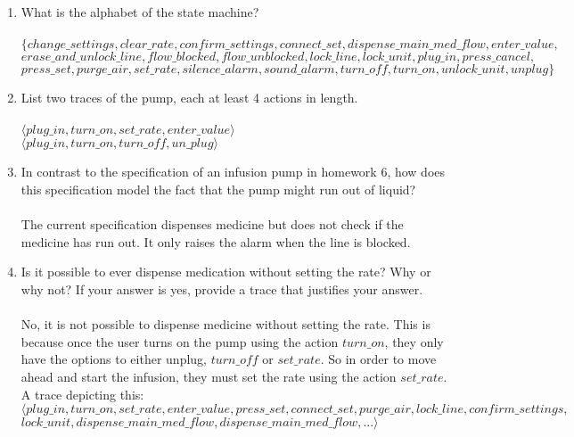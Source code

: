 ﻿\documentclass{article}
\begin{document}
\begin{enumerate}
    \item What is the alphabet of the state machine? \\
\\
      $\{change\_settings, clear\_rate, confirm\_settings, connect\_set, dispense\_main\_med\_flow, enter\_value,$ \\
      $erase\_and\_unlock\_line, flow\_blocked, flow\_unblocked, lock\_line, lock\_unit, plug\_in, press\_cancel,$\\
      $press\_set, purge\_air, set\_rate, silence\_alarm, sound\_alarm, turn\_off, turn\_on, unlock\_unit, unplug \}$


    \item List two traces of the pump, each at least 4 actions in length. \\
\\
$\langle plug\_in, turn\_on, set\_rate, enter\_value \rangle$ \\
$\langle plug\_in, turn\_on, turn\_off, un\_plug \rangle$


    \item In contrast to the specification of an infusion pump in homework 6, how does this specification model the fact that  the pump might run out of liquid? \\
      \\
      The current specification dispenses medicine but does not check if the medicine has run out. It only raises the alarm when the line is blocked. 


    \item Is it possible to ever dispense medication without setting the rate?  Why or why not? If your answer is yes, provide a trace that justifies your answer. \\
\\
No, it is not possible to dispense medicine without setting the rate. This is because once the user turns on the pump using the action $turn\_on$, they only have the options to either unplug, $turn\_off$ or $set\_rate$. So in order to move ahead and start the infusion, they must set the rate using the action $set\_rate$. \\
A trace depicting this:\\
$\langle plug\_in, turn\_on, set\_rate, enter\_value, press\_set, connect\_set, purge\_air, lock\_line, confirm\_settings,$\\ $lock\_unit, dispense\_main\_med\_flow, dispense\_main\_med\_flow, ... \rangle$
      

\end{enumerate}
\end{document}

